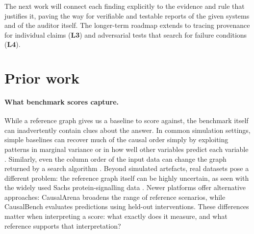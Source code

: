\documentclass[12pt,letterpaper]{article}
\newcommand{\ours}{}
\begin{document}
The next work will connect each finding explicitly to the evidence and rule that justifies it, paving the way for verifiable and testable reports of the given systems and of the auditor itself. The longer-term roadmap extends to tracing provenance for individual claims (\textbf{L3}) and adversarial tests that search for failure conditions (\textbf{L4}).

\section{Prior work}
\label{sec:prior}

\paragraph{What benchmark scores capture.} While a reference graph gives us a baseline to score against, the benchmark itself can inadvertently contain clues about the answer. In common simulation settings, simple baselines can recover much of the causal order simply by exploiting patterns in marginal variance or in how well other variables predict each variable \citep{reisach2021beware,reisach2023scale}. Similarly, even the column order of the input data can change the graph returned by a search algorithm \citep{kitson2024impact}. Beyond simulated artefacts, real datasets pose a different problem: the reference graph itself can be highly uncertain, as seen with the widely used Sachs protein-signalling data \citep{brouillard2025landscape,sachs2005causal}. Newer platforms offer alternative approaches: CausalArena \citep{li2026causalarena} broadens the range of reference scenarios, while CausalBench \citep{chevalley2025causalbench,replogle2022mapping} evaluates predictions using held-out interventions. These differences matter when interpreting a score: what exactly does it measure, and what reference supports that interpretation?\ours
\end{document}
